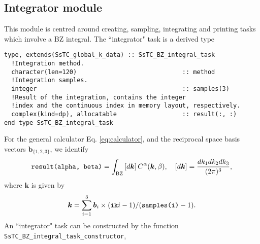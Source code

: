 \documentclass[10pt,a4paper]{article}
\begin{document}
\subsection{Integrator module}
This module is centred around creating, sampling, integrating and printing tasks which involve a BZ integral. The ``integrator" task is a derived type
\begin{lstlisting}[caption={Derived type corresponding to a ``integrator" task.},captionpos=b]
type, extends(SsTC_global_k_data) :: SsTC_BZ_integral_task
  !Integration method.
  character(len=120)                             :: method
  !Integration samples.
  integer                                        :: samples(3)
  !Result of the integration, contains the integer
  !index and the continuous index in memory layout, respectively.
  complex(kind=dp), allocatable                  :: result(:, :)
end type SsTC_BZ_integral_task
\end{lstlisting}
For the general calculator Eq. \eqref{eq:calculator}, and the reciprocal space basis vectors $\bm{b}_{\{1, 2, 3\}}$, we identify
\begin{equation}\label{eq:integrator}
\verb|result(alpha, beta)| = \int_{\text{BZ}} \left[d\bm{k}\right]C^{\alpha}(\bm{k},\beta),\quad \left[d\bm{k}\right] = \frac{dk_1 dk_2 dk_3}{(2\pi)^3},
\end{equation}
where $\bm{k}$ is given by
\begin{equation}\label{eq:vec_coords_integrator}
\bm{k} = \sum_{i=1}^3 \bm{b}_i\times (\verb|ik|i-1)/(\verb|samples(i)| - 1).
\end{equation}
An ``integrator" task can be constructed by the function \verb|SsTC_BZ_integral_task_constructor|,
\end{document}
